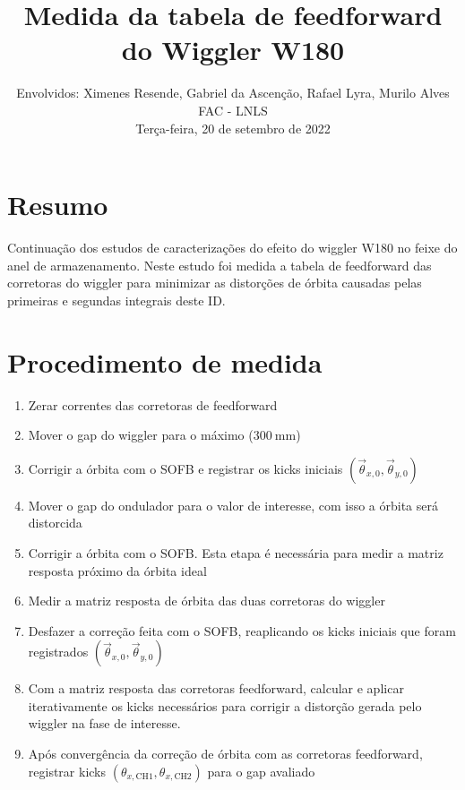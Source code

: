 \documentclass[a4paper,
               keeplastbox,   %
               ]{jacow}
\begin{document}
\title{Medida da tabela de feedforward do Wiggler W180}

\author{Envolvidos: Ximenes Resende, Gabriel da Ascenção, Rafael Lyra, Murilo Alves \\ FAC - LNLS \\ Terça-feira, 20 de setembro de 2022}
\maketitle
%
\section{Resumo}
Continuação dos estudos de caracterizações do efeito do wiggler W180 no feixe do anel de armazenamento. Neste estudo foi medida a tabela de feedforward das corretoras do wiggler para minimizar as distorções de órbita causadas pelas primeiras e segundas integrais deste ID. 

\section{Procedimento de medida}

\begin{enumerate}
    \item Zerar correntes das corretoras de feedforward
    \item Mover o gap do wiggler para o máximo ($\SI{300}{\milli\meter}$)
    \item Corrigir a órbita com o SOFB e registrar os kicks iniciais $\left(\vec{\theta}_{x, 0}, \vec{\theta}_{y, 0}\right)$
    \item Mover o gap do ondulador para o valor de interesse, com isso a órbita será distorcida
    \item Corrigir a órbita com o SOFB. Esta etapa é necessária para medir a matriz resposta próximo da órbita ideal
    \item Medir a matriz resposta de órbita das duas corretoras do wiggler
    \item Desfazer a correção feita com o SOFB, reaplicando os kicks iniciais que foram registrados $\left(\vec{\theta}_{x, 0}, \vec{\theta}_{y, 0}\right)$
    \item Com a matriz resposta das corretoras feedforward, calcular e aplicar iterativamente os kicks necessários para corrigir a distorção gerada pelo wiggler na fase de interesse. 
    \item Após convergência da correção de órbita com as corretoras feedforward, registrar kicks $\left(\theta_{x, \mathrm{CH1}},\theta_{x, \mathrm{CH2}}\right)$ para o gap avaliado
\end{enumerate}
\end{document}
